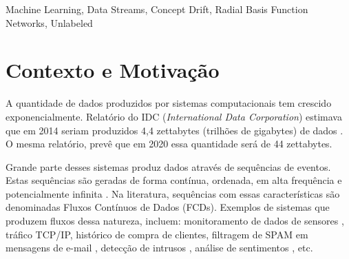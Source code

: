 \documentclass[qual, classic, a4paper]{ufbathesis}
\begin{document}
\abstract

\blindtext

\begin{keywords}
    Machine Learning, Data Streams, Concept Drift, Radial Basis Function Networks, Unlabeled
\end{keywords}


\tableofcontents

\listoffigures

\listoftables

\mainmatter

% 
% 
% 
%

 \label{introducao}

\section{Contexto e Motivação}

A quantidade de dados produzidos por sistemas computacionais tem crescido exponencialmente.
Relatório do IDC (\textit{International Data Corporation}) estimava que em 2014 seriam produzidos 4,4 zettabytes (trilhões de gigabytes) de dados \cite{idc_report}.
O mesma relatório, prevê que em 2020 essa quantidade será de 44 zettabytes.

Grande parte desses sistemas produz dados através de sequências de eventos.
Estas sequências são geradas de forma contínua, ordenada, em alta frequência e potencialmente infinita \cite{Feigenbaum:2003:ALD:589343.592594}.
Na literatura, sequências com essas características são denominadas Fluxos Contínuos de Dados (FCDs).
Exemplos de sistemas que produzem fluxos dessa natureza, incluem:
monitoramento de dados de sensores \cite{Lee:Wang:Ryu:2007},
tráfico TCP/IP, 
histórico de compra de clientes,
filtragem de SPAM em mensagens de e-mail \cite{Katakis:2010:TRC:1746286.1746291},
detecção de intrusos \cite{Lane:1998:AOL:3000292.3000339},
análise de sentimentos \cite{Smailovic:2014:SAL:2941772.2941857}, 
etc.
\end{document}
